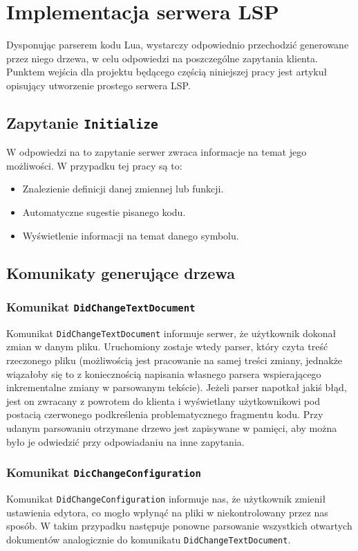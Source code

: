 \chapter{Implementacja serwera LSP}
Dysponując parserem kodu Lua, wystarczy odpowiednio przechodzić generowane przez niego drzewa, w celu odpowiedzi na poszczególne zapytania klienta. Punktem wejścia dla projektu będącego częścią niniejszej pracy jest artykuł \cite{lsp_sample} opisujący utworzenie prostego serwera LSP.

\section{Zapytanie \texttt{Initialize}}
W odpowiedzi na to zapytanie serwer zwraca informacje na temat jego możliwości. W przypadku tej pracy są to:

\begin{itemize}
    \item Znalezienie definicji danej zmiennej lub funkcji.
    \item Automatyczne sugestie pisanego kodu.
    \item Wyświetlenie informacji na temat danego symbolu.
\end{itemize}

\section{Komunikaty generujące drzewa}
\subsection{Komunikat \texttt{DidChangeTextDocument}}
Komunikat \texttt{DidChangeTextDocument} informuje serwer, że użytkownik dokonał zmian w danym pliku. Uruchomiony zostaje wtedy parser, który czyta treść rzeczonego pliku (możliwością jest pracowanie na samej treści zmiany, jednakże wiązałoby się to z koniecznością napisania własnego parsera wspierającego inkrementalne zmiany w parsowanym tekście). Jeżeli parser napotkał jakiś błąd, jest on zwracany z powrotem do klienta i wyświetlany użytkownikowi pod postacią czerwonego podkreślenia problematycznego fragmentu kodu. Przy udanym parsowaniu otrzymane drzewo jest zapisywane w pamięci, aby można było je odwiedzić przy odpowiadaniu na inne zapytania.

\subsection{Komunikat \texttt{DicChangeConfiguration}}
Komunikat \texttt{DidChangeConfiguration} informuje nas, że użytkownik zmienił ustawienia edytora, co mogło wpłynąć na pliki w niekontrolowany przez nas sposób. W takim przypadku następuje ponowne parsowanie wszystkich otwartych dokumentów analogicznie do komunikatu \texttt{DidChangeTextDocument}.

